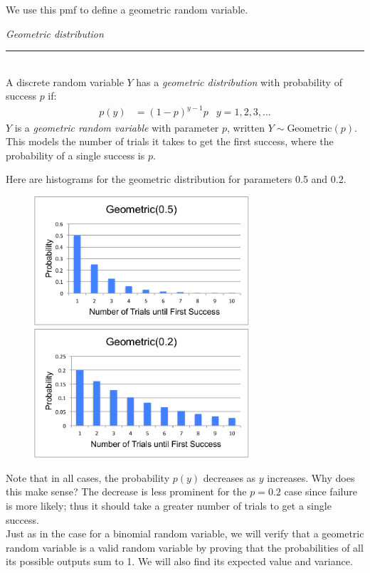 \documentclass[notes.tex]{subfiles}
\begin{document}
We use this pmf to define a geometric random variable.

\begin{framed}
  \emph{Geometric distribution}\\
  \rule{\dimexpr{}\fboxrule}{.1pt} \\
A discrete random variable $Y$ has a \emph{geometric distribution} with probability of success $p$ if: 
\begin{align*}
p(y) &= (1-p)^{y-1} p & y = 1, 2, 3, \dots
\end{align*}
$Y$ is a \emph{geometric random variable} with parameter $p$, written $Y \sim \text{Geometric}(p)$. This models the number of trials it takes to get the first success, where the probability of a single success is $p$.
\end{framed}

Here are histograms for the geometric distribution for parameters 0.5 and 0.2. 

\begin{figure}[H]
\centering
\includegraphics[width=8cm]{geometric5}
\includegraphics[width=8cm]{geometric2}
\end{figure}

Note that in all cases, the probability $p(y)$ decreases as $y$ increases. Why does this make sense? The decrease is less prominent for the $p = 0.2$ case since failure is more likely; thus it should take a greater number of trials to get a single success.\\

Just as in the case for a binomial random variable, we will verify that a geometric random variable is a valid random variable by proving that the probabilities of all its possible outputs sum to 1. We will also find its expected value and variance.\\
\end{document}
